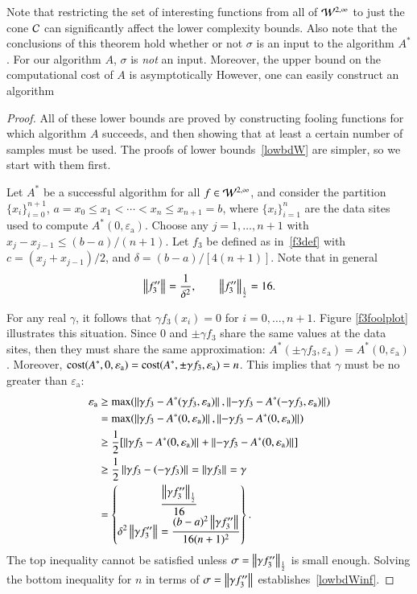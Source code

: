 \documentclass[review]{elsarticle}
\newcommand{\abstol}{\varepsilon_{\textrm{a}}}
\theoremstyle{definition}
\begin{document}
Note that restricting the set of interesting functions from all of $ \cw^{2,\infty}$ to just the cone $\cc$ can significantly affect the lower complexity bounds.  Also note that the conclusions of this theorem hold whether or not $\sigma$ is an input to the algorithm $A^*$.  For our algorithm $A$, $\sigma$ is \emph{not} an input. Moreover, the upper bound on the computational cost of $A$ is asymptotically  However, one can easily construct an algorithm

\begin{proof}
	All of these lower bounds are proved by constructing fooling functions for which algorithm $A$ succeeds, and then showing that at least a certain number of samples must be used.  The proofs of lower bounds~\eqref{lowbdW} are simpler, so we start with them first.
	
	Let $A^*$ be a successful algorithm for all $f \in  \cw^{2,\infty}$, and consider the partition $\{x_i\}_{i=0}^{n+1}$, $a=x_0 \le x_1 < \cdots < x_n \le x_{n+1} = b$, where $\{x_i\}_{i=1}^n$ are the data sites used to compute  $A^*(0,\abstol)$.  Choose any $j=1, \ldots, n+1$ with $x_j-x_{j-1} \le (b-a)/(n+1)$.  Let $f_3$ be defined as in~\eqref{f3def} with $c = (x_j+x_{j-1})/2$, and $\delta  = (b-a)/[4(n+1)]$.  Note that in general
	\begin{equation}
	\norm{f_3''} = \frac{1}{\delta^{2}}, \qquad \norm[\frac 12]{f_3''} = 16.
	\end{equation}

For any real $\gamma$, it follows that $\gamma f_3(x_i)=0$ for $i=0, \ldots, n+1$.  Figure \ref{f3foolplot} illustrates this situation.  Since $0$ and $\pm \gamma f_3$ share the same values at the data sites, then they must share the same approximation: $A^*(\pm \gamma f_3,\abstol) = A^*(0,\abstol)$.  Moreover, $\cost(A^*,0,\abstol) = \cost(A^*,\pm \gamma f_3,\abstol) = n$.  This implies  that $\gamma$ must be no greater than $\abstol$:
	\begin{align*}
	\abstol  &\ge \max(\norm{\gamma f_3 - A^*(\gamma f_3,\abstol)}, \norm{-\gamma f_3 - A^*(-\gamma f_3,\abstol)}) \\
	&= \max(\norm{\gamma f_3 - A^*(0,\abstol)}, \norm{-\gamma f_3 - A^*(0,\abstol)}) \\
	& \ge \frac{1}{2} [\norm{\gamma f_3 - A^*(0,\abstol)} + \norm{-\gamma f_3 - A^*(0,\abstol)}] \\
	& \ge \frac{1}{2} \norm{\gamma f_3 - (-\gamma f_3)} =  \norm{\gamma f_3} = \gamma \\
	& = \begin{Bmatrix} \displaystyle \frac{ \norm[\frac 12]{\gamma f_3''}}{16}  \\
	\displaystyle \delta^2 	\norm{\gamma f_3''} =  \frac{(b-a)^2 \norm{\gamma f_3''}}{16(n+1)^2}
	\end{Bmatrix}.
	\end{align*}
The top inequality cannot be satisfied unless $\sigma = \norm[\frac 12]{\gamma f_3''}$ is small enough.  Solving the bottom inequality for $n$ in terms of $\sigma =  \norm{\gamma f_3''}$ establishes~\eqref{lowbdWinf}.
	

\end{proof}
\end{document}
